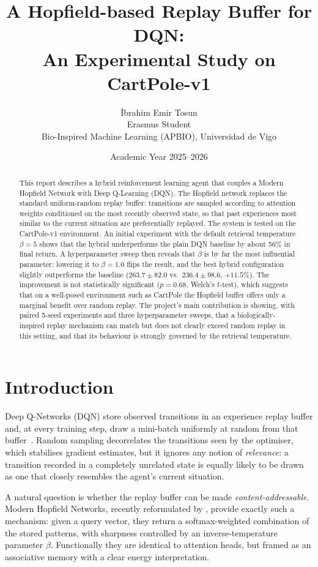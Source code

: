\documentclass[a4paper,11pt]{article}
\title{A Hopfield-based Replay Buffer for DQN:\\
An Experimental Study on CartPole-v1}
\author{\.{I}brahim Emir Tosun \\ {\small Erasmus Student} \\ {\small Bio-Inspired Machine Learning (APBIO), Universidad de Vigo}}
\date{Academic Year 2025--2026}
\begin{document}
\maketitle

\begin{abstract}
\noindent
This report describes a hybrid reinforcement learning agent that couples a
Modern Hopfield Network with Deep Q-Learning (DQN). The Hopfield network
replaces the standard uniform-random replay buffer: transitions are sampled
according to attention weights conditioned on the most recently observed
state, so that past experiences most similar to the current situation are
preferentially replayed. The system is tested on the CartPole-v1 environment.
An initial experiment with the default retrieval temperature $\beta=5$ shows
that the hybrid underperforms the plain DQN baseline by about 56\% in final
return. A hyperparameter sweep then reveals that $\beta$ is by far the most
influential parameter: lowering it to $\beta=1.0$ flips the result, and the
best hybrid configuration slightly outperforms the baseline ($263.7 \pm 82.0$
vs.\ $236.4 \pm 98.6$, $+11.5\%$). The improvement is not statistically
significant ($p=0.68$, Welch's $t$-test), which suggests that on a
well-posed environment such as CartPole the Hopfield buffer offers only a
marginal benefit over random replay. The project's main contribution is
showing, with paired 5-seed experiments and three hyperparameter sweeps,
that a biologically-inspired replay mechanism can match but does not clearly
exceed random replay in this setting, and that its behaviour is strongly
governed by the retrieval temperature.
\end{abstract}

\section{Introduction}
\label{sec:intro}

Deep Q-Networks (DQN) store observed transitions in an experience replay
buffer and, at every training step, draw a mini-batch uniformly at random
from that buffer~\citep{mnih2015human}. Random sampling decorrelates the
transitions seen by the optimiser, which stabilises gradient estimates, but
it ignores any notion of \emph{relevance}: a transition recorded in a
completely unrelated state is equally likely to be drawn as one that
closely resembles the agent's current situation.

A natural question is whether the replay buffer can be made
\emph{content-addressable}. Modern Hopfield Networks, recently reformulated
by \citet{ramsauer2020hopfield}, provide exactly such a mechanism: given a
query vector, they return a softmax-weighted combination of the stored
patterns, with sharpness controlled by an inverse-temperature parameter
$\beta$. Functionally they are identical to attention heads, but framed as
an associative memory with a clear energy interpretation.
\end{document}
